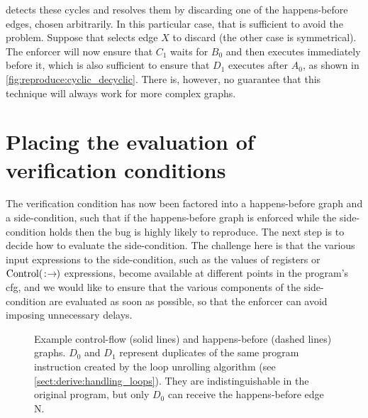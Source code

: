 {\Technique} detects these cycles and resolves them by discarding one
of the happens-before edges, chosen arbitrarily.  In this particular
case, that is sufficient to avoid the problem.  Suppose that
{\technique} selects edge $X$ to discard (the other case is
symmetrical).  The enforcer will now ensure that $C_1$ waits for $B_0$
and then executes immediately before it, which is also sufficient to
ensure that $D_1$ executes after $A_0$, as shown in
\autoref{fig:reproduce:cyclic_decyclic}.  There is, however, no
guarantee that this technique will always work for more complex
graphs.

\section{Placing the evaluation of verification conditions}
\label{sect:enforce:place_vcs}

The verification condition has now been factored into a happens-before
graph and a side-condition, such that if the happens-before graph is
enforced while the side-condition holds then the bug is highly likely
to reproduce.  The next step is to decide how to evaluate the
side-condition.  The challenge here is that the various input
expressions to the side-condition, such as the values of registers or
$\mathrm{Control}(\mathrm{}\!:\!\mathrm{\!}\!\rightarrow\!\mathrm{\!})$ expressions, become available at different
points in the program's \gls{cfg}, and we would like to ensure that
the various components of the side-condition are evaluated as soon as
possible, so that the enforcer can avoid imposing unnecessary delays.

\begin{figure}
  \vspace{-8pt}
  \vspace{-4pt}
  \caption{Example control-flow (solid lines) and happens-before
    (dashed lines) graphs.  $D_0$ and $D_1$ represent duplicates of
    the same program instruction created by the loop unrolling
    algorithm (see \autoref{sect:derive:handling_loops}).  They are
    indistinguishable in the original program, but only $D_0$ can
    receive the happens-before edge N.}
  \label{fig:place_conditions_example}
  \vspace{4pt}
\end{figure}

